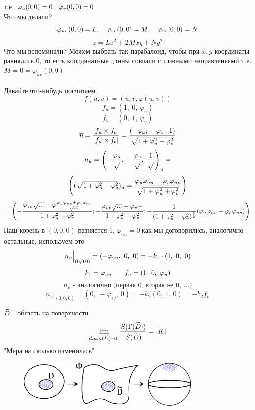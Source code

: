 \documentclass[main]{subfiles}
\begin{document}
    т.е. $\varphi_u(0,0) = 0 \quad \varphi_v(0,0) = 0 $\\
    Что мы делали?
    \[\varphi_{uu}(0,0) = L,\quad \varphi_{uv}(0,0) = M,\quad \varphi_{vv}(0,0) = N\]
    \[z = Lx^2 + 2 Mxy + Ny^2\]
    Что мы вспоминали? Можем выбрать так парабалоид, чтобы при $x,y$ координаты равнялись 0, то есть координатные длины совпали с главными направлениями
    т.е. $M = 0 = \varphi_{uv}(0,0)$\\ \ \\
    Давайте что-нибудь посчитаем
    \[f(u,v) = (u,v, \varphi(u,v))\]
    \[f_u = (1,\ 0,\ \varphi_u)\]
    \[f_v = (0,\ 1,\ \varphi_v)\]
    \[\overline{n} = \frac{f_u \times f_v}{|f_u \times f_v|} = \frac{(-\varphi_u;\ -\varphi_v;\ 1)}{\sqrt{1 + \varphi_u^2 + \varphi_v^2}}\]
    \[n_u = \left(- \frac{\varphi_u}{\sqrt{}},\
    - \frac{\varphi_v}{\sqrt{}},\
    \frac{1}{\sqrt{}}\right)_u = \]
    \[\left((\sqrt{1 + \varphi_u^2 + \varphi_v^2})_u =
    \frac{\varphi_u \varphi_{uu} + \varphi_v \varphi_{uv}}{\sqrt{1 + \varphi_u^2 + \varphi_v^2}}\right)\]
    \[= \left(-\frac{\varphi_{uu}\sqrt{...} - \varphi \frac{\varphi_u \varphi_{uu} + \varphi_v \varphi_{vv}}{\sqrt{...}}}{1+ \varphi_u^2 + \varphi_v^2};
    - \frac{\varphi_{vv} \sqrt{...} - \varphi_v \frac{...}{...}}{1 + \varphi_u^2 + \varphi_v^2};
    -\frac{1}{(1+ \varphi_u^2 + \varphi_v^2)^{\frac{3}{2}}} (\varphi_u \varphi_{uv} + \varphi_v \varphi_{uv})\right)\]
    Наш корень в $(0,0,0)$ равняется 1, $\varphi_{uu}=0$ как мы договорились, аналогично остальные, используем это:
    \[n_u \Big|_{(0,0,0)} = \left(-\varphi_{uu},\ 0,\ 0\right) = -k_1 \cdot (1,\ 0,\ 0)\]
    \[k_1 = \varphi_{uu} \qquad f_u = (1,\ 0,\ \varphi_u)\]
    \[n_v \text{ - аналогично (первая 0, вторая не 0, ...)}\]
    \[n_v \Big|_{(0,0,0)} = (0,\ -\varphi_{vv},\ 0) = -k_2 (0,\ 1,\ 0) = -k_2 f_v\]

    \begin{theorem}
        $\widetilde{D}$ - область на поверхности
        \[\lim_{diam(\widetilde{D}) \rightarrow 0}\frac{S(\Gamma(\widetilde{D}))}{S(\widetilde{D})} = |K|\]
        "Мера на сколько изменилась"{}
        \begin{figure}[H]
            \includegraphics[width=9cm]{pics/10_5.png}
            \centering
        \end{figure}

    \end{theorem}
\end{document}
